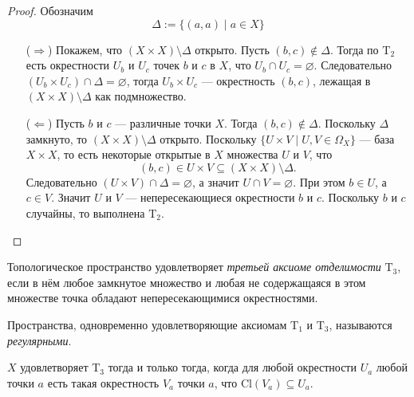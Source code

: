 \documentclass[12pt,a4paper]{article}
\newcommand{\Cl}{\ensuremath{\mathrm{Cl}}\xspace}
\newcommand{\T}{\ensuremath{\mathrm{T}}\xspace}
\begin{document}
    \begin{proof}
        Обозначим
        \[\Delta := \{(a, a) \mid a \in X\}\]
        \begin{itemize}
            \item[($\Rightarrow$)] Покажем, что $(X \times X) \setminus \Delta$ открыто. Пусть $(b, c) \notin \Delta$. Тогда по $\T_2$ есть окрестности $U_b$ и $U_c$ точек $b$ и $c$ в $X$, что $U_b \cap U_c = \varnothing$. Следовательно $(U_b \times U_c) \cap \Delta = \varnothing$, тогда $U_b \times U_c$ --- окрестность $(b, c)$, лежащая в $(X \times X) \setminus \Delta$ как подмножество.

            \item[($\Leftarrow$)] Пусть $b$ и $c$ --- различные точки $X$. Тогда $(b, c) \notin \Delta$. Поскольку $\Delta$ замкнуто, то $(X \times X) \setminus \Delta$ открыто. Поскольку $\{U \times V \mid U, V \in \Omega_X\}$ --- база $X \times X$, то есть некоторые открытые в $X$ множества $U$ и $V$, что
            \[(b, c) \in U \times V \subseteq (X \times X) \setminus \Delta.\]
            Следовательно $(U \times V) \cap \Delta = \varnothing$, а значит $U \cap V = \varnothing$. При этом $b \in U$, а $c \in V$. Значит $U$ и $V$ --- непересекающиеся окрестности $b$ и $c$. Поскольку $b$ и $c$ случайны, то выполнена $\T_2$. 
        \end{itemize}
    \end{proof}

    \begin{definition}
        Топологическое пространство удовлетворяет \emph{третьей аксиоме отделимости} $\T_3$, если в нём любое замкнутое множество и любая не содержащаяся в этом множестве точка обладают непересекающимися окрестностями.

        Пространства, одновременно удовлетворяющие аксиомам $\T_1$ и $\T_3$, называются \emph{регулярными}.
    \end{definition}

    \begin{theorem}
        $X$ удовлетворяет $\T_3$ тогда и только тогда, когда для любой окрестности $U_a$ любой точки $a$ есть такая окрестность $V_a$ точки $a$, что $\Cl(V_a) \subseteq U_a$.
    \end{theorem}
\end{document}
